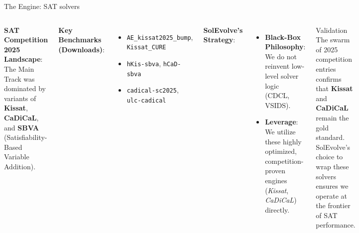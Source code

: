 \documentclass[10pt, aspectratio=169]{beamer}
\begin{document}
\begin{frame}{The Engine: SAT solvers}
    \begin{columns}
        \textbf{SAT Competition 2025 Landscape}:
        The Main Track was dominated by variants of \textbf{Kissat}, \textbf{CaDiCaL}, and \textbf{SBVA} (Satisfiability-Based Variable Addition).
        
        \vspace{0.2cm}
        \textbf{Key Benchmarks (Downloads)}:
        \begin{itemize} \footnotesize
            \item \texttt{AE\_kissat2025\_bump}, \texttt{Kissat\_CURE}
            \item \texttt{hKis-sbva}, \texttt{hCaD-sbva}
            \item \texttt{cadical-sc2025}, \texttt{ulc-cadical}
        \end{itemize}

        \vspace{0.3cm}
        \textbf{SolEvolve's Strategy}:
        \begin{itemize}
            \item \textbf{Black-Box Philosophy}: We do not reinvent low-level solver logic (CDCL, VSIDS).
            \item \textbf{Leverage}: We utilize these highly optimized, competition-proven engines (\textit{Kissat}, \textit{CaDiCaL}) directly.
        \end{itemize}

        \begin{alertblock}{Validation}
            The swarm of 2025 competition entries confirms that \textbf{Kissat} and \textbf{CaDiCaL} remain the gold standard. SolEvolve's choice to wrap these solvers ensures we operate at the frontier of SAT performance.
        \end{alertblock}
    \end{columns}
\end{frame}
\end{document}
